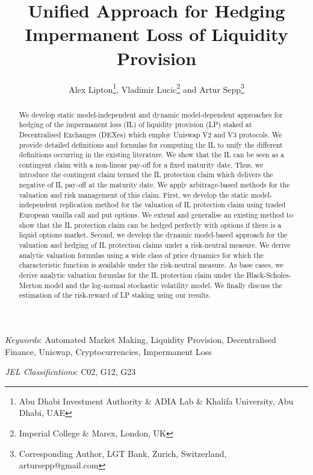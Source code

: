\documentclass[pdftex,11pt,a4paper] {article}
\date{\displaydate{date}}
\begin{document}
\title{Unified Approach for Hedging Impermanent Loss of Liquidity Provision}

\author{Alex Lipton\thanks{Abu Dhabi Investment Authority \& ADIA Lab \& Khalifa University, Abu Dhabi, UAE}, Vladimir Lucic\thanks{Imperial College \& Marex, London, UK} and Artur Sepp\thanks{Corresponding Author, LGT Bank, Zurich, Switzerland, artursepp@gmail.com}}

\maketitle



\begin{abstract}
We develop static model-independent and dynamic model-dependent approaches for hedging of the impermanent loss (IL) of liquidity provision (LP) staked at Decentralised Exchanges (DEXes) which employ Uniswap V2 and V3 protocols. We provide detailed definitions and formulas for computing the IL to unify the different definitions occurring in the existing literature. We show that the IL can be seen as a contingent claim with a non-linear pay-off for a fixed maturity date. Thus, we introduce the contingent claim termed the IL protection claim which delivers the negative of IL pay-off at the maturity date. We apply arbitrage-based methods for the valuation and risk management of this claim. First, we develop the static model-independent replication method for the valuation of IL protection claim using traded European vanilla call and put options. We extend and generalise an existing method to show that the IL protection claim can be hedged perfectly with options if there is a liquid options market. Second, we develop the dynamic model-based approach for the valuation and hedging of IL protection claims under a risk-neutral measure. We derive analytic valuation formulas using a wide class of price dynamics for which the characteristic function is available under the risk-neutral measure. As base cases, we derive analytic valuation formulas for the IL protection claim under the Black-Scholes-Merton model and the log-normal stochastic volatility model. We finally discuss the estimation of the risk-reward of LP staking using our results.
\end{abstract}


\textit{Keywords}: Automated Market Making, Liquidity Provision, Decentralised Finance, Uniswap, Cryptocurrencies, Impermanent Loss

\textit{JEL Classifications}:  C02, G12, G23
\end{document}
